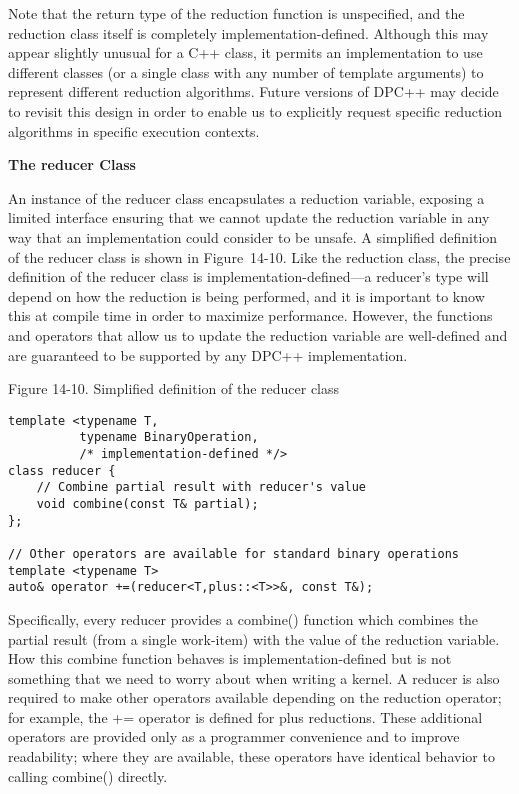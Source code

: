 Note that the return type of the reduction function is unspecified, and the reduction class itself is completely implementation-defined. Although this may appear slightly unusual for a C++ class, it permits an implementation to use different classes (or a single class with any number of template arguments) to represent different reduction algorithms. Future versions of DPC++ may decide to revisit this design in order to enable us to explicitly request specific reduction algorithms in specific execution contexts.\par

\hspace*{\fill} \par %
\textbf{The reducer Class}

An instance of the reducer class encapsulates a reduction variable, exposing a limited interface ensuring that we cannot update the reduction variable in any way that an implementation could consider to be unsafe. A simplified definition of the reducer class is shown in Figure 14-10. Like the reduction class, the precise definition of the reducer class is implementation-defined—a reducer's type will depend on how the reduction is being performed, and it is important to know this at compile time in order to maximize performance. However, the functions and operators that allow us to update the reduction variable are well-defined and are guaranteed to be supported by any DPC++ implementation.\par

\hspace*{\fill} \par %
Figure 14-10. Simplified definition of the reducer class
\begin{lstlisting}[caption={}]
template <typename T,
		  typename BinaryOperation,
	      /* implementation-defined */>
class reducer {
	// Combine partial result with reducer's value
	void combine(const T& partial);
};

// Other operators are available for standard binary operations
template <typename T>
auto& operator +=(reducer<T,plus::<T>>&, const T&);
\end{lstlisting}

Specifically, every reducer provides a combine() function which combines the partial result (from a single work-item) with the value of the reduction variable. How this combine function behaves is implementation-defined but is not something that we need to worry about when writing a kernel. A reducer is also required to make other operators available depending on the reduction operator; for example, the += operator is defined for plus reductions. These additional operators are provided only as a programmer convenience and to improve readability; where they are available, these operators have identical behavior to calling combine() directly.\par

